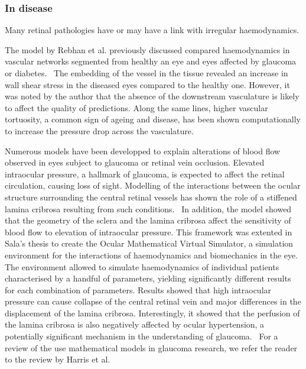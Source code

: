 \documentclass[12pt,a4paper]{journal}
\begin{document}
\subsubsection*{In disease}

Many retinal pathologies have or may have a link with irregular haemodynamics.

The model by Rebhan et al. previously discussed compared haemodynamics in vascular networks segmented from healthy an eye and eyes affected by glaucoma or diabetes.~\cite{Rebhan_2019}
The embedding of the vessel in the tissue revealed an increase in wall shear stress in the diseased eyes compared to the healthy one.
However, it was noted by the author that the absence of the downstream vasculature is likely to affect the quality of predictions.
Along the same lines, higher vascular tortuosity, a common sign of ageing and disease, has been shown computationally to increase the pressure drop across the vasculature.~\cite{Malek_2014}

Numerous models have been developped to explain alterations of blood flow observed in eyes subject to glaucoma or retinal vein occlusion.
Elevated intraocular pressure, a hallmark of glaucoma, is expected to affect the retinal circulation, causing loss of sight.
Modelling of the interactions between the ocular structure surrounding the central retinal vessels has shown the role of a stiffened lamina cribrosa resulting from such conditions.~\cite{Guidoboni_2014}
In addition, the model showed that the geometry of the sclera and the lamina cribrosa affect the sensitivity of blood flow to elevation of intraocular pressure.
This framework was extented in Sala's thesis to create the Ocular Mathematical Virtual Simulator, a simulation environment for the interactions of haemodynamics and biomechanics in the eye.~\cite{Sala_2018,Sala_2020}
The environment allowed to simulate haemodynamics of individual patients characterised by a handful of parameters, yielding significantly different results for each combination of parameters.
Results showed that high intraocular pressure can cause collapse of the central retinal vein and major differences in the displacement of the lamina cribrosa.
Interestingly, it showed that the perfusion of the lamina cribrosa is also negatively affected by ocular hypertension, a potentially significant mechanism in the understanding of glaucoma.~\cite{Sala_2020}
For a review of the use mathematical models in glaucoma research, we refer the reader to the review by Harris et al.~\cite{Harris_2013}
\end{document}
